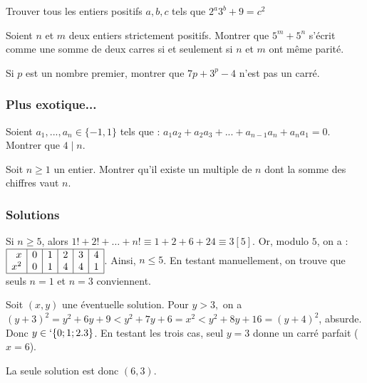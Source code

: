 \begin{exo}
Trouver tous les entiers positifs $a,b,c$ tels que $2^a3^b+9=c^2$
\end{exo}


\begin{exo}
Soient $n$ et $m$ deux entiers strictement positifs. Montrer que $5^m + 5^n$ s’écrit comme une
somme de deux carres si et seulement si $n$ et $m$ ont même parité.
\end{exo}



\begin{exo} Si $p$ est un nombre premier, montrer que $7p+3^p-4$ n'est pas un carré.
\end{exo}


\subsubsection{Plus exotique...}

\begin{exo} Soient $a_1,...,a_n \in \{-1,1\}$ tels que : $a_1a_2+a_2a_3+...+a_{n-1}a_n+a_na_1=0$.
Montrer que $4\mid n$.
\end{exo}


\begin{exo}
Soit $n\ge1$ un entier. Montrer qu'il existe un multiple de $n$ dont la somme des chiffres vaut $n$.
\end{exo}


\subsubsection{Solutions}


\begin{sol} Si $n\geq5$, alors $ 1!+2!+\ldots+n!\equiv 1+2+6+24\equiv 3 [5]$.
Or, modulo $5$, on a : $\begin{array}{|r|c|c|c|c|l|}
\hline
x & 0 & 1 & 2 & 3 & 4 \\
x^2 & 0 & 1 & 4 & 4 & 1 \\
\hline
\end{array}$. Ainsi, $n\leq5$. En testant manuellement, on trouve que seuls $n=1$ et $n=3$ conviennent.
\end{sol}

\begin{sol}
Soit $(x,y)$ une éventuelle solution.
Pour $y>3,$ on a $(y+3)^2=y^2+6y+9<y^2+7y+6=x^2<y^2+8y+16=(y+4)^2$, absurde.
Donc $y\in`\{0;1;2.3\}$. En testant les trois cas, seul $y=3$ donne un carré parfait ($x=6$).

La seule solution est donc $(6,3)$.
\end{sol}



